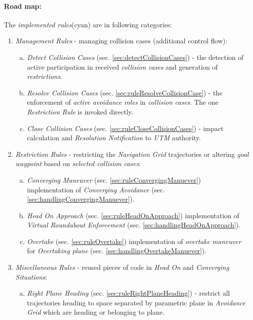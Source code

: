 \paragraph{Road map:} The \emph{implemented rules}(cyan) are in following categories:
\begin{enumerate}
    \item \emph{Management Rules} - managing collision cases (additional control flow):
        \begin{enumerate}[a.]
            
            \item \emph{Detect Collision Cases} (sec. \ref{sec:detectCollisionCases}) - the detection of active participation in received \emph{collision cases} and generation of \emph{restrictions}.
            
            \item \emph{Resolve Collision Cases} (sec. \ref{sec:ruleResolveCollisionCase}) - the enforcement of \emph{active avoidance roles} in \emph{collision cases}. The one \emph{Restriction Rule} is invoked directly.
            
            \item \emph{Close Collision Cases} (sec. \ref{sec:ruleCloseCollisionCases}) - impact calculation and \emph{Resolution Notification} to \emph{UTM} authority.
        \end{enumerate}
    
    \item \emph{Restriction Rules} - restricting the \emph{Navigation Grid} trajectories or altering \emph{goal waypoint} based on \emph{selected collision cases}:
    \begin{enumerate}[a.]
        \item \emph{Converging Maneuver} (sec. \ref{sec:ruleConvergingManuever}) implementation of \emph{Converging Avoidance} (sec. \ref{sec:handlingConvergingManuever}).
        
        \item \emph{Head On Approach} (sec. \ref{sec:ruleHeadOnApproach}) implementation of \emph{Virtual Roundabout Enforcement} (sec. \ref{sec:handlingHeadOnApproach}).
        
        \item \emph{Overtake} (sec. \ref{sec:ruleOvertake}) implementation of \emph{overtake maneuver} for \emph{Overtaking plane} (sec. \ref{sec:handlingOvertakeManuever}).
    \end{enumerate}
    
    \item \emph{Miscellaneous Rules} - reused pieces of code in \emph{Head On} and \emph{Converging Situations}:
    \begin{enumerate}[a.]
        \item \emph{Right Plane Heading} (sec. \ref{sec:ruleRightPlaneHeading}) - restrict all trajectories heading to space separated by parametric plane in \emph{Avoidance Grid} which are heading or belonging to plane.
        

\end{enumerate}
\end{enumerate}
